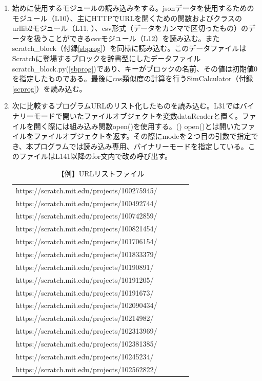 \documentclass[a4paper,10pt,onecolumn,oneside,openany]{jsbook}
\begin{document}
\begin{enumerate}
 \item 始めに使用するモジュールの読み込みをする。jsonデータを使用するためのモジュール（L10）、主にHTTPでURLを開くための関数およびクラスのurllib2モジュール（L11, \cite{urllib}）、csv形式（データをカンマで区切ったもの）のデータを扱うことができるcsvモジュール（L12）を読み込む。またscratch\_block（付録\ref{sbprog}）を同様に読み込む。このデータファイルはScratchに登場するブロックを辞書型にしたデータファイルscratch\_block.py(\ref{sbprog})であり、キーがブロックの名前、その値は初期値0を指定したものである。最後にcos類似度の計算を行うSimCalculator（付録\ref{scprog}）を読み込む。
 \item 次に比較するプログラムURLのリスト化したものを読み込む。L31ではバイナリーモードで開いたファイルオブジェクトを変数dataReaderと置く。ファイルを開く際には組み込み関数open()を使用する。(\cite{open}) open()とは開いたファイルをファイルオブジェクトを返す。その際にmodeを２つ目の引数で指定でき、本プログラムでは読み込み専用、バイナリーモードを指定している。このファイルはL141以降のfor文内で改め呼び出す。
\begin{table}[h]
 \caption{【例】URLリストファイル}
 \label{urllist}
 \begin{center}
\begin{tabular}{lclcl}
https://scratch.mit.edu/projects/100275945/ \\
https://scratch.mit.edu/projects/100492744/ \\
https://scratch.mit.edu/projects/100742859/ \\
https://scratch.mit.edu/projects/100821454/ \\
https://scratch.mit.edu/projects/101706154/ \\
https://scratch.mit.edu/projects/101833379/ \\
https://scratch.mit.edu/projects/10190891/ \\
https://scratch.mit.edu/projects/10191205/ \\
https://scratch.mit.edu/projects/10191673/ \\
https://scratch.mit.edu/projects/102090434/ \\
https://scratch.mit.edu/projects/10214982/ \\
https://scratch.mit.edu/projects/102313969/ \\
https://scratch.mit.edu/projects/102381385/ \\
https://scratch.mit.edu/projects/10245234/ \\
https://scratch.mit.edu/projects/102562822/ \\

\end{tabular}
\end{center}
\end{table}
\end{enumerate}
\end{document}
